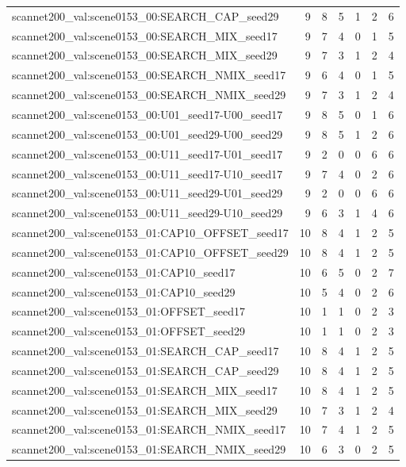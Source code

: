 \begin{table}[t]
\begin{tabular}{lrrrrrr}
scannet200\_val:scene0153\_00:SEARCH\_CAP\_seed29 & 9 & 8 & 5 & 1 & 2 & 6 \\
scannet200\_val:scene0153\_00:SEARCH\_MIX\_seed17 & 9 & 7 & 4 & 0 & 1 & 5 \\
scannet200\_val:scene0153\_00:SEARCH\_MIX\_seed29 & 9 & 7 & 3 & 1 & 2 & 4 \\
scannet200\_val:scene0153\_00:SEARCH\_NMIX\_seed17 & 9 & 6 & 4 & 0 & 1 & 5 \\
scannet200\_val:scene0153\_00:SEARCH\_NMIX\_seed29 & 9 & 7 & 3 & 1 & 2 & 4 \\
scannet200\_val:scene0153\_00:U01\_seed17-U00\_seed17 & 9 & 8 & 5 & 0 & 1 & 6 \\
scannet200\_val:scene0153\_00:U01\_seed29-U00\_seed29 & 9 & 8 & 5 & 1 & 2 & 6 \\
scannet200\_val:scene0153\_00:U11\_seed17-U01\_seed17 & 9 & 2 & 0 & 0 & 6 & 6 \\
scannet200\_val:scene0153\_00:U11\_seed17-U10\_seed17 & 9 & 7 & 4 & 0 & 2 & 6 \\
scannet200\_val:scene0153\_00:U11\_seed29-U01\_seed29 & 9 & 2 & 0 & 0 & 6 & 6 \\
scannet200\_val:scene0153\_00:U11\_seed29-U10\_seed29 & 9 & 6 & 3 & 1 & 4 & 6 \\
scannet200\_val:scene0153\_01:CAP10\_OFFSET\_seed17 & 10 & 8 & 4 & 1 & 2 & 5 \\
scannet200\_val:scene0153\_01:CAP10\_OFFSET\_seed29 & 10 & 8 & 4 & 1 & 2 & 5 \\
scannet200\_val:scene0153\_01:CAP10\_seed17 & 10 & 6 & 5 & 0 & 2 & 7 \\
scannet200\_val:scene0153\_01:CAP10\_seed29 & 10 & 5 & 4 & 0 & 2 & 6 \\
scannet200\_val:scene0153\_01:OFFSET\_seed17 & 10 & 1 & 1 & 0 & 2 & 3 \\
scannet200\_val:scene0153\_01:OFFSET\_seed29 & 10 & 1 & 1 & 0 & 2 & 3 \\
scannet200\_val:scene0153\_01:SEARCH\_CAP\_seed17 & 10 & 8 & 4 & 1 & 2 & 5 \\
scannet200\_val:scene0153\_01:SEARCH\_CAP\_seed29 & 10 & 8 & 4 & 1 & 2 & 5 \\
scannet200\_val:scene0153\_01:SEARCH\_MIX\_seed17 & 10 & 8 & 4 & 1 & 2 & 5 \\
scannet200\_val:scene0153\_01:SEARCH\_MIX\_seed29 & 10 & 7 & 3 & 1 & 2 & 4 \\
scannet200\_val:scene0153\_01:SEARCH\_NMIX\_seed17 & 10 & 7 & 4 & 1 & 2 & 5 \\
scannet200\_val:scene0153\_01:SEARCH\_NMIX\_seed29 & 10 & 6 & 3 & 0 & 2 & 5 \\

\end{tabular}
\end{table}
